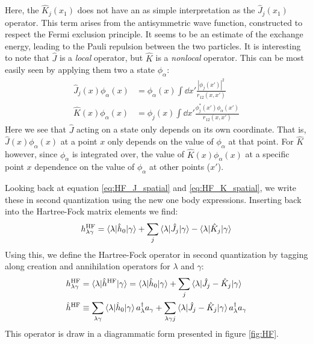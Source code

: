 \documentclass{article}
\newcommand{\inner}[3]{\braket{#1|#2|#3}}
\newcommand{\hnull}{\hat{h}_0}
\newcommand{\crt}[1]{a_{#1}^{\dagger}}
\newcommand{\ani}[1]{a_{#1}}
\newcommand{\hafo}[1]{#1^{\text{HF}}}
\begin{document}
    Here, the $\hat{K}_j (x_1)$ does not have an as simple interpretation as the $\hat{J}_j(x_1)$ operator. This term arises from the antisymmetric wave function, constructed to respect the Fermi exclusion principle. It seems to be an estimate of the exchange energy, leading to the Pauli repulsion between the two particles.
    It is interesting to note that $\hat{J}$ is a \textit{local} operator, but $\hat{K}$ is a \textit{nonlocal} operator. This can be most easily seen by applying them two a state $\phi_{\alpha}$:
    \begin{align*}
        \hat{J}_j(x)\phi_\alpha(x) &= \phi_\alpha(x) \int \dd{x'} \frac{|\phi_j(x')|^2}{r_{12}(x, x')} \\
        \hat{K}(x)\phi_\alpha(x) &= \phi_j(x) \int \dd{x'} \frac{\phi^*_j(x')\phi_\alpha(x')}{r_{12}(x, x')}
    \end{align*} 
    Here we see that $\hat{J}$ acting on a state only depends on its own coordinate. That is, $\hat{J}(x)\phi_\alpha(x)$ at a point $x$ only depends on the value of $\phi_\alpha$ at that point. For $\hat{K}$ however, since $\phi_\alpha$ is integrated over, the value of $\hat{K}(x)\phi_\alpha(x)$ at a specific point $x$ dependence on the value of $\phi_\alpha$ at other points ($x'$).

    Looking back at equation \eqref{eq:HF_J_spatial} and \eqref{eq:HF_K_spatial}, we write these in second quantization using the new one body expressions. Inserting back into the Hartree-Fock matrix elements we find:
    \begin{align*}
        \hafo{h_{\lambda\gamma}} = \inner{\lambda}{\hnull}{\gamma} + \sum_j \inner{\lambda}{\hat{J}_j}{\gamma} - \inner{\lambda}{\hat{K}_j}{\gamma}
    \end{align*}
    Using this, we define the Hartree-Fock operator in second quantization by tagging along creation and annihilation operators for $\lambda$ and $\gamma$:
    \begin{align*}
        \hafo{h_{\lambda\gamma}} &= \inner{\lambda}{\hafo{\hat{h}}}{\gamma} = \inner{\lambda}{\hnull}{\gamma} + \sum_j \inner{\lambda}{\hat{J}_j - \hat{K}_j}{\gamma} \\
        \hafo{\hat{h}} &\equiv \sum_{\lambda\gamma} \inner{\lambda}{\hnull}{\gamma}\crt{\lambda}\ani{\gamma} + \sum_{\lambda\gamma j} \inner{\lambda}{\hat{J}_j - \hat{K}_j}{\gamma}\crt{\lambda}\ani{\gamma}
    \end{align*}
    This operator is draw in a diagrammatic form presented in figure \ref{fig:HF}.
    
\end{document}
